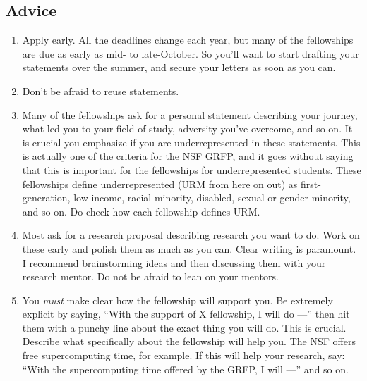 \documentclass[12pt]{article}
\begin{document}
\subsection{Advice}
\begin{enumerate}
\item Apply early. All the deadlines change each year, but many of the fellowships are due as early as mid- to late-October. So you’ll want to start drafting your statements over the summer, and secure your letters as soon as you can.

\item Don’t be afraid to reuse statements. 

\item Many of the fellowships ask for a personal statement describing your journey, what led you to your field of study, adversity you’ve overcome, and so on. It is crucial you emphasize if you are underrepresented in these statements. This is actually one of the criteria for the NSF GRFP, and it goes without saying that this is important for the fellowships for underrepresented students. These fellowships define underrepresented (URM from here on out) as first-generation, low-income, racial minority, disabled, sexual or gender minority, and so on. Do check how each fellowship defines URM.

\item Most ask for a research proposal describing research you want to do. Work on these early and polish them as much as you can. Clear writing is paramount. I recommend brainstorming ideas and then discussing them with your research mentor. Do not be afraid to lean on your mentors. 

\item You \textit{must} make clear how the fellowship will support you. Be extremely explicit by saying, ``With the support of X fellowship, I will do ---'' then hit them with a punchy line about the exact thing you will do. This is crucial. Describe what specifically about the fellowship will help you. The NSF offers free supercomputing time, for example. If this will help your research, say: ``With the supercomputing time offered by the GRFP, I will ---'' and so on. 


\end{enumerate}
\end{document}
